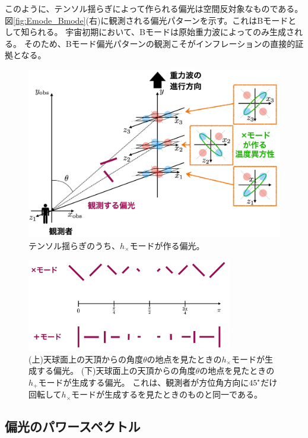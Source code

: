 \documentclass[../../main.tex]{subfiles}
\begin{document}
このように、テンソル揺らぎによって作られる偏光は空間反対象なものである。
図\ref{fig:Emode_Bmode}(右)に観測される偏光パターンを示す。これはBモードとして知られる。
宇宙初期において、Bモードは原始重力波によってのみ生成される。
そのため、Bモード偏光パターンの観測こそがインフレーションの直接的証拠となる。
\begin{figure}[H]
    \centering
    \includegraphics[width=1.0\textwidth]{intro/tensor_polarization.pdf}
    \caption{テンソル揺らぎのうち、$h_{\times}$モードが作る偏光。}
    \label{fig:tensor_polarization}
\end{figure}
\begin{figure}[H]
    \centering
    \includegraphics[width=0.8\textwidth]{intro/tensor_pol_theta.pdf}
    \caption{(上)天球面上の天頂からの角度$\theta$の地点を見たときの$h_{\times}$モードが生成する偏光。
    (下)天球面上の天頂からの角度$\theta$の地点を見たときの$h_{+}$モードが生成する偏光。
    これは、観測者が方位角方向に$45\tcdegree$だけ回転して$h_{\times}$モードが生成するを見たときのものと同一である。}
    \label{fig:tensor_polarization_theta}
\end{figure}

\subsection{偏光のパワースペクトル}
\end{document}
